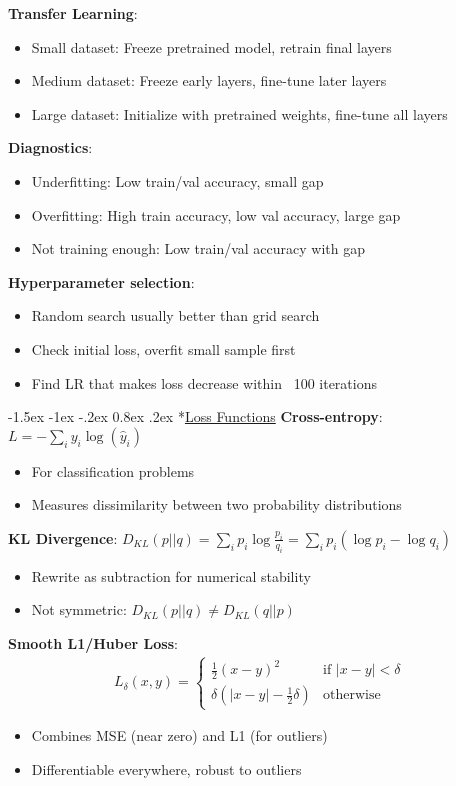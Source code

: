\documentclass{article}
\makeatletter
\renewcommand\section{\@startsection{section}{1}{\z@}%
                                  {-1.5ex \@plus -1ex \@minus -.2ex}%
                                  {0.8ex \@plus.2ex}%
                                  {\normalfont\small\bfseries}}
\makeatother
\begin{document}
\begin{multicols}{3}
\textbf{Transfer Learning}:
\begin{itemize}
\item Small dataset: Freeze pretrained model, retrain final layers
\item Medium dataset: Freeze early layers, fine-tune later layers
\item Large dataset: Initialize with pretrained weights, fine-tune all layers
\end{itemize}

\textbf{Diagnostics}:
\begin{itemize}
\item Underfitting: Low train/val accuracy, small gap
\item Overfitting: High train accuracy, low val accuracy, large gap
\item Not training enough: Low train/val accuracy with gap
\end{itemize}

\textbf{Hyperparameter selection}:
\begin{itemize}
\item Random search usually better than grid search
\item Check initial loss, overfit small sample first
\item Find LR that makes loss decrease within ~100 iterations
\end{itemize}

\section*{\underline{Loss Functions}}
\textbf{Cross-entropy}: $L = -\sum_i y_i \log(\hat{y}_i)$
\begin{itemize}
\item For classification problems
\item Measures dissimilarity between two probability distributions
\end{itemize}

\textbf{KL Divergence}: $D_{KL}(p||q) = \sum_i p_i \log\frac{p_i}{q_i} = \sum_i p_i(\log p_i - \log q_i)$
\begin{itemize}
\item Rewrite as subtraction for numerical stability
\item Not symmetric: $D_{KL}(p||q) \neq D_{KL}(q||p)$
\end{itemize}

\textbf{Smooth L1/Huber Loss}:
\begin{align*}
L_{\delta}(x, y) = \begin{cases}
\frac{1}{2}(x-y)^2 & \text{if } |x-y| < \delta \\
\delta(|x-y| - \frac{1}{2}\delta) & \text{otherwise}
\end{cases}
\end{align*}
\begin{itemize}
\item Combines MSE (near zero) and L1 (for outliers)
\item Differentiable everywhere, robust to outliers
\end{itemize}


\end{multicols}
\end{document}
